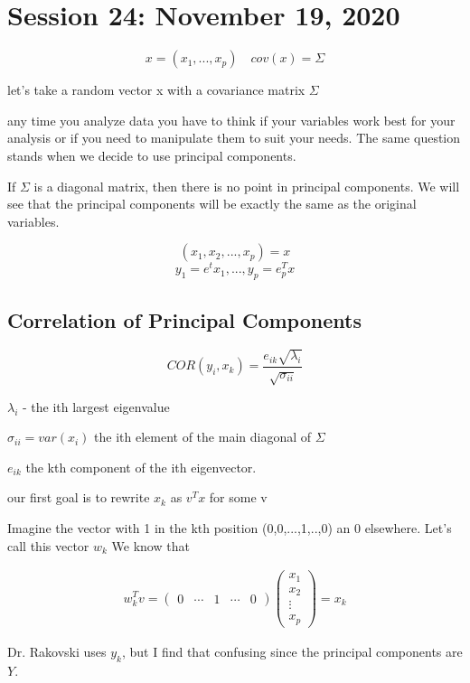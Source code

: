 \chapter{Session 24: November 19, 2020}

\[x = (x_1,...,x_p) \quad cov(x) = \Sigma\]

let's take a random vector x with a covariance matrix $\Sigma$ 

any time you analyze data you have to think if your variables work best for your analysis or if you need to manipulate them to suit your needs. The same question stands when we decide to use principal components.

If $\Sigma$ is a diagonal matrix, then there is no point in principal components. We will see that the principal components will be exactly the same as the original variables.

\[(x_1,x_2,...,x_p) = x\]
\[y_1 = e^tx_1,...,y_p = e^T_px\]

\section{Correlation of Principal Components}
\[COR(y_i,x_k) = \frac{e_{ik}\sqrt{\lambda_i}}{\sqrt{\sigma_{ii}}}\]

$\lambda_i$ - the ith largest eigenvalue

$\sigma_{ii} = var(x_i)$ the ith element of the main diagonal of $\Sigma$ 

$e_{ik}$ the kth component of the ith eigenvector.

our first goal is to rewrite $x_k$ as $v^Tx$ for some v

Imagine the vector with 1 in the kth position (0,0,...,1,..,0) an 0 elsewhere. Let's call this vector $w_k$ We know that

\begin{gather*}
    w_k^T v = \begin{pmatrix}
    0 & \cdots &1 &\cdots &0
    \end{pmatrix}
    \begin{pmatrix}
    x_1 \\ x_2 \\ \vdots \\ x_p
    \end{pmatrix} = x_k
\end{gather*}

Dr. Rakovski uses $y_k$, but I find that confusing since the principal components are $Y$.

